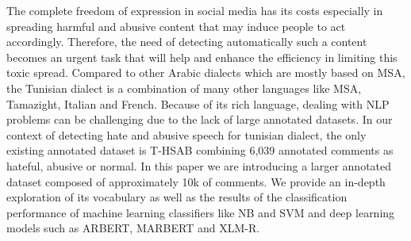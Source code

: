 The complete freedom of expression in social media has its costs especially in spreading harmful and abusive content that may induce people to act accordingly. Therefore, the need of detecting automatically such a content becomes an urgent task that will help and enhance the efficiency in limiting this toxic spread. Compared to other Arabic dialects which are mostly based on MSA, the Tunisian dialect is a combination of many other languages like MSA, Tamazight, Italian and French. Because of its rich language, dealing with NLP problems can be challenging due to the lack of large annotated datasets. In our context of detecting hate and abusive speech for tunisian dialect, the only existing annotated dataset is T-HSAB combining 6,039 annotated comments as hateful, abusive or normal. In this paper we are introducing a larger annotated dataset composed of approximately 10k of comments. We provide an in-depth exploration of its vocabulary as well as the results of the classification performance of machine learning classifiers like NB and SVM and deep learning models such as ARBERT, MARBERT and XLM-R.
